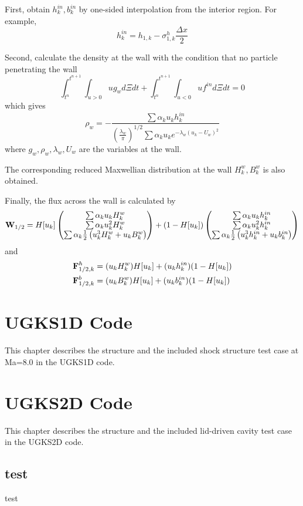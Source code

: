 \documentclass[a4paper]{book}
\begin{document}
First, obtain $h_k^{in},b_k^{in}$ by one-sided interpolation from the interior region. For example,
$$h_{k}^{in} = h_{1,k}-\sigma_{1,k}^h\frac{\Delta x}{2}$$

Second, calculate the density at the wall with the condition that no particle penetrating the wall
$$\int_{t^n}^{t^{n+1}}\int_{u>0} ug_w d\Xi dt+\int_{t^n}^{t^{n+1}}\int_{u<0} uf^{in}d\Xi dt=0$$
which gives
$$\rho_w = -\frac{\sum\alpha_k u_k h_k^{in}}{\left(\frac{\lambda_w}{\pi}\right)^{1/2}\sum\alpha_k u_k e^{-\lambda_w(u_k-U_w)^2}}$$
where $g_w,\rho_w,\lambda_w,U_w$ are the variables at the wall.

The corresponding reduced Maxwellian distribution at the wall $H_k^w,B_k^w$ is also obtained.

Finally, the flux across the wall is calculated by
$$
{\bf W}_{1/2} = H[u_k]
\begin{pmatrix}
    \sum\alpha_k u_k H_k^{w}\\
    \sum\alpha_k u_k^2 H_k^{w}\\
    \sum\alpha_k \frac{1}{2}\left(u_k^3 H_k^{w}+u_k B_k^{w}\right)
\end{pmatrix} 
+(1-H[u_k])
\begin{pmatrix}
    \sum\alpha_k u_k h_k^{in}\\
    \sum\alpha_k u_k^2 h_k^{in}\\
    \sum\alpha_k \frac{1}{2}\left(u_k^3 h_k^{in}+u_k b_k^{in}\right)
\end{pmatrix} 
$$
and
$$
\begin{aligned}
    {\bf F}_{1/2,k}^h &= (u_k H_k^{w})H[u_k]+(u_k h_k^{in})(1-H[u_k]) \\
    {\bf F}_{1/2,k}^b &= (u_k B_k^{w})H[u_k]+(u_k b_k^{in})(1-H[u_k]) \\
\end{aligned} 
$$

\chapter{UGKS1D Code}
This chapter describes the structure and the included shock structure test case at Ma=8.0 in the UGKS1D code.

\chapter{UGKS2D Code}
This chapter describes the structure and the included lid-driven cavity test case in the UGKS2D code.
\section{test}
test
\end{document}

